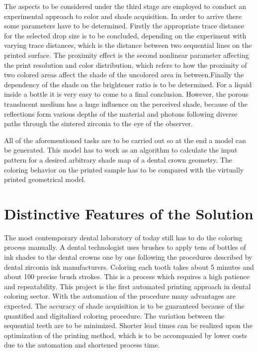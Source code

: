  The aspects to be considered under the third stage are employed to conduct an experimental approach to color and shade acquisition. In order to arrive there some parameters have to be determined. Firstly the appropriate trace distance for the selected drop size is to be concluded, depending on the experiment with varying trace distances, which is the distance between two sequential lines on the printed surface. The proximity effect is the second nonlinear parameter affecting the print resolution and color distribution, which refers to how the proximity of two colored areas affect the shade of the uncolored area in between.Finally the dependency of the shade on the brightener ratio is to be determined. For a liquid inside a bottle it is very easy to come to a final conclusion. However, the porous translucent medium has a huge influence on the perceived shade, because of the  reflections form various depths of the material and photons following diverse paths through the sintered zirconia to the eye of the observer.
 
 All of the aforementioned tasks are to be carried out so at the end a model can be generated. This model has to work as an algorithm to calculate the input pattern for a desired arbitrary shade map of a dental crown geometry. The coloring behavior on the printed sample has to be compared with the virtually printed geometrical model.
 

\chapter{Distinctive Features of the Solution}
\label{sec:Unterscheidungsmerkmale}
The most contemporary dental laboratory of today still has to do the coloring process manually. A dental technologist uses brushes to apply tens of bottles of ink shades to the dental crowns one by one following the procedures described by dental zirconia ink manufacturers. Coloring each tooth takes about 5 minutes and about 100 precise brush strokes. This is a process which requires a high patience and repeatability. This project is the first automated printing approach in dental coloring sector. With the automation of the procedure many advantages are expected. The accuracy of shade acquisition is to be guaranteed because of the quantified and digitalized coloring procedure. The variation between the sequential teeth are to be minimized. Shorter lead times can be realized upon the optimization of the printing method, which is to be accompanied by lower costs due to the automation and shortened process time.

